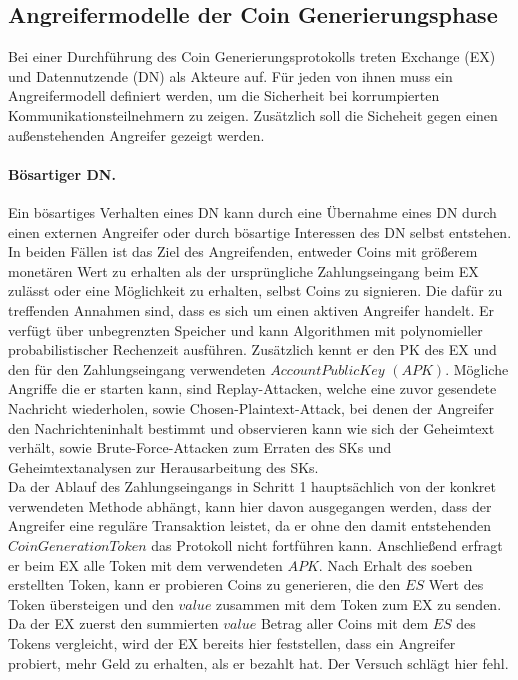 \documentclass[
	fontsize=11pt,
	headings=small,
	parskip=half,           %
	bibliography=totoc,
	numbers=noenddot,       %
	open=any,               %
]{scrreprt}
\begin{document}
\subsection{Angreifermodelle der Coin Generierungsphase}
\label{subsec:adversaryCoinGen}
Bei einer Durchführung des Coin Generierungsprotokolls treten Exchange (EX) und Datennutzende (DN) als Akteure auf. Für jeden von ihnen muss ein Angreifermodell definiert werden, um die Sicherheit bei korrumpierten Kommunikationsteilnehmern zu zeigen. Zusätzlich soll die Sicheheit gegen einen außenstehenden Angreifer gezeigt werden.

\paragraph{Bösartiger DN.}
Ein bösartiges Verhalten eines DN kann durch eine Übernahme eines DN durch einen externen Angreifer oder durch bösartige Interessen des DN selbst entstehen. In beiden Fällen ist das Ziel des Angreifenden, entweder Coins mit größerem monetären Wert zu erhalten als der ursprüngliche Zahlungseingang beim EX zulässt oder eine Möglichkeit zu erhalten, selbst Coins zu signieren. Die dafür zu treffenden Annahmen sind, dass es sich um einen aktiven Angreifer handelt. Er verfügt über unbegrenzten Speicher und kann Algorithmen mit polynomieller probabilistischer Rechenzeit ausführen. Zusätzlich kennt er den PK des EX und den für den Zahlungseingang verwendeten $AccountPublicKey$ $(APK)$. Mögliche Angriffe die er starten kann, sind Replay-Attacken, welche eine zuvor gesendete Nachricht wiederholen, sowie Chosen-Plaintext-Attack, bei denen der Angreifer den Nachrichteninhalt bestimmt und observieren kann wie sich der Geheimtext verhält, sowie Brute-Force-Attacken zum Erraten des SKs und Geheimtextanalysen zur Herausarbeitung des SKs.\\

Da der Ablauf des Zahlungseingangs in Schritt 1 hauptsächlich von der konkret verwendeten Methode abhängt, kann hier davon ausgegangen werden, dass der Angreifer eine reguläre Transaktion leistet, da er ohne den damit entstehenden $CoinGenerationToken$ das Protokoll nicht fortführen kann. 
Anschließend erfragt er beim EX alle Token mit dem verwendeten $APK$. Nach Erhalt des soeben erstellten Token, kann er probieren Coins zu generieren, die den $ES$ Wert des Token übersteigen und den $value$ zusammen mit dem Token zum EX zu senden. Da der EX zuerst den summierten $value$ Betrag aller Coins mit dem $ES$ des Tokens vergleicht, wird der EX bereits hier feststellen, dass ein Angreifer probiert, mehr Geld zu erhalten, als er bezahlt hat. Der Versuch schlägt hier fehl.
\end{document}
